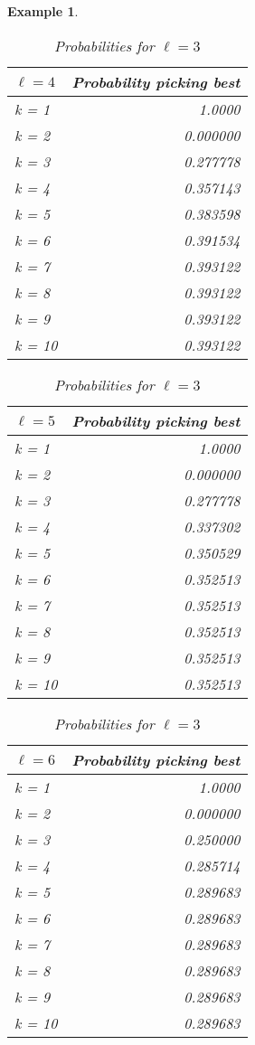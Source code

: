 \documentclass{article}
\newtheorem{example}{Example} %
\begin{document}
\begin{example}
\begin{table}[H]
\begin{minipage}{0.33\textwidth}
\small
\begin{tabular}{lr}
\hline
$\ell=4$ & Probability picking best  \\
\hline
k = 1  &     1.0000  \\
k = 2  &     0.000000  \\
k = 3  &     0.277778  \\
k = 4  &     0.357143  \\
k = 5  &     0.383598  \\
k = 6  &     0.391534  \\
k = 7  &     0.393122  \\
k = 8  &     0.393122  \\
k = 9  &     0.393122  \\
k = 10 &     0.393122  \\
\hline
\end{tabular}
\caption{Probabilities for $\ell=1$}
\end{minipage}\hfill
\centering
\begin{minipage}{0.33\textwidth}
\small
\begin{tabular}{lr}
\hline
$\ell=5$ & Probability picking best \\
\hline
k = 1  &     1.0000 \\
k = 2  &     0.000000 \\
k = 3  &     0.277778  \\
k = 4  &     0.337302 \\
k = 5  &     0.350529 \\
k = 6  &     0.352513  \\
k = 7  &     0.352513 \\
k = 8  &     0.352513  \\
k = 9  &     0.352513  \\
k = 10 &     0.352513  \\
\hline
\end{tabular}
\caption{Probabilities for $\ell=2$}
\end{minipage}\hfill
\centering
\begin{minipage}{0.33\textwidth}
\small
\begin{tabular}{lr}
\hline
$\ell=6$ & Probability picking best  \\
\hline
k = 1  &     1.0000 \\
k = 2  &     0.000000 \\
k = 3  &     0.250000  \\
k = 4  &     0.285714 \\
k = 5  &     0.289683 \\
k = 6  &     0.289683  \\
k = 7  &     0.289683 \\
k = 8  &     0.289683  \\
k = 9  &     0.289683  \\
k = 10 &     0.289683  \\
\hline
\end{tabular}
\caption{Probabilities for $\ell=3$}
\end{minipage}\hfill
\end{table}


\end{example}
\end{document}
